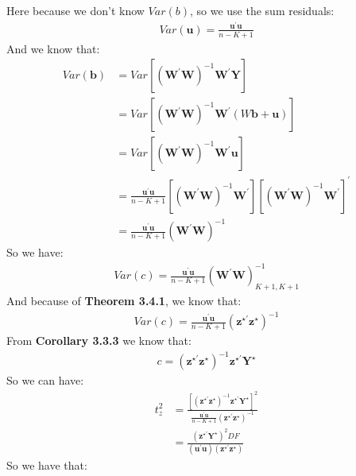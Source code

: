 \documentclass{article}
\begin{document}
Here because we don't know $Var(b)$, so we use the sum residuals:
	\begin{align*}
		Var(\boldsymbol{u}) = \frac{\boldsymbol{u}^\prime \boldsymbol{u}}{n - K + 1}
	\end{align*}
And we know that:
	\begin{align*}
		Var(\boldsymbol{b}) &= Var[(\boldsymbol{W}^\prime \boldsymbol{W})^{-1} \boldsymbol{W}^\prime \boldsymbol{Y}]\\
		&= Var[(\boldsymbol{W}^\prime \boldsymbol{W})^{-1} \boldsymbol{W}^\prime (W \boldsymbol{b} + \boldsymbol{u})]\\
		&= Var[(\boldsymbol{W}^\prime \boldsymbol{W})^{-1} \boldsymbol{W}^\prime \boldsymbol{u}]\\
		&= \frac{\boldsymbol{u}^\prime \boldsymbol{u}}{n - K + 1} [(\boldsymbol{W}^\prime \boldsymbol{W})^{-1} \boldsymbol{W}^\prime] [(\boldsymbol{W}^\prime \boldsymbol{W})^{-1} \boldsymbol{W}^\prime]^\prime\\
		&= \frac{\boldsymbol{u}^\prime \boldsymbol{u}}{n - K + 1} (\boldsymbol{W}^\prime \boldsymbol{W})^{-1}
	\end{align*}
So we have:
	\begin{align*}
		Var(c) = \frac{\boldsymbol{u}^\prime \boldsymbol{u}}{n - K + 1} (\boldsymbol{W}^\prime \boldsymbol{W})^{-1}_{K+1, K+1}
	\end{align*}
And because of \textbf{Theorem 3.4.1}, we know that:
	\begin{align*}
		Var(c) = \frac{\boldsymbol{u}^\prime \boldsymbol{u}}{n - K + 1} (\boldsymbol{z}^{\star\prime} \boldsymbol{z}^\star)^{-1}
	\end{align*}
From \textbf{Corollary 3.3.3} we know that:
	\begin{align*}
		c = (\boldsymbol{z}^{\star\prime} \boldsymbol{z}^\star)^{-1} \boldsymbol{z}^{\star\prime} \boldsymbol{Y}^\star
	\end{align*}
So we can have:
	\begin{align*}
		t^2_z &= \frac{[(\boldsymbol{z}^{\star\prime} \boldsymbol{z}^\star)^{-1} \boldsymbol{z}^{\star\prime} \boldsymbol{Y}^\star]^2}{\frac{\boldsymbol{u}^\prime \boldsymbol{u}}{n - K + 1} (\boldsymbol{z}^{\star\prime} \boldsymbol{z}^\star)^{-1}}\\
		&= \frac{(\boldsymbol{z}^{\star\prime} \boldsymbol{Y}^\star)^2 DF}{(\boldsymbol{u}^\prime \boldsymbol{u}) (\boldsymbol{z}^{\star\prime} \boldsymbol{z}^\star)}
	\end{align*}
So we have that:
\end{document}
